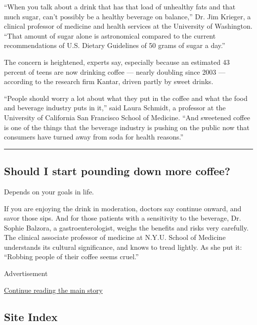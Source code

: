``When you talk about a drink that has that load of unhealthy fats and
that much sugar, can't possibly be a healthy beverage on balance,'' Dr.
Jim Krieger, a clinical professor of medicine and health services at the
University of Washington. ``That amount of sugar alone is astronomical
compared to the current recommendations of U.S. Dietary Guidelines of 50
grams of sugar a day.''

The concern is heightened, experts say, especially because an estimated
43 percent of teens are now drinking coffee --- nearly doubling since
2003 --- according to the research firm Kantar, driven partly by sweet
drinks.

``People should worry a lot about what they put in the coffee and what
the food and beverage industry puts in it,'' said Laura Schmidt, a
professor at the University of California San Francisco School of
Medicine. ``And sweetened coffee is one of the things that the beverage
industry is pushing on the public now that consumers have turned away
from soda for health reasons.''

\begin{center}\rule{0.5\linewidth}{\linethickness}\end{center}

\hypertarget{should-i-start-pounding-down-more-coffee}{%
\subsection{Should I start pounding down more
coffee?}\label{should-i-start-pounding-down-more-coffee}}

Depends on your goals in life.

If you are enjoying the drink in moderation, doctors say continue
onward, and savor those sips. And for those patients with a sensitivity
to the beverage, Dr. Sophie Balzora, a gastroenterologist, weighs the
benefits and risks very carefully. The clinical associate professor of
medicine at N.Y.U. School of Medicine understands its cultural
significance, and knows to tread lightly. As she put it: ``Robbing
people of their coffee seems cruel.''

Advertisement

\protect\hyperlink{after-bottom}{Continue reading the main story}

\hypertarget{site-index}{%
\subsection{Site Index}\label{site-index}}

